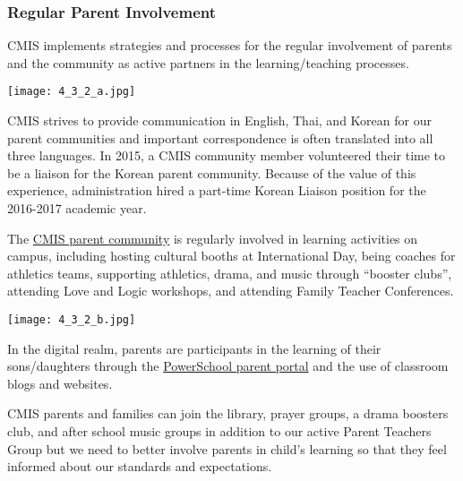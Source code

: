 \subsubsection{Regular Parent Involvement}



\begin{findings}
CMIS implements strategies and processes for the regular involvement of parents and the community as active partners in the learning/teaching processes.

{\centering\texttt{[image: 4\_3\_2\_a.jpg]}}

CMIS strives to provide communication in English, Thai, and Korean for our parent communities and important correspondence is often translated into all three languages.  In 2015, a CMIS community member volunteered their time to be a liaison for the Korean parent community.  Because of the value of this experience, administration hired a part-time Korean Liaison position for the 2016-2017 academic year.

The \href{http://blogs.cmis.ac.th/ptg/}{CMIS parent community} is regularly involved in learning activities on campus, including hosting cultural booths at International Day, being coaches for athletics teams, supporting athletics, drama, and music through “booster clubs”, attending Love and Logic workshops, and attending Family Teacher Conferences.

{\centering\texttt{[image: 4\_3\_2\_b.jpg]}}

In the digital realm, parents are participants in the learning of their sons/daughters through the \href{https://cmis.powerschool.com/public/}{PowerSchool parent portal} and the use of classroom blogs and websites.


CMIS parents and families can join the library, prayer groups, a drama boosters club, and after school music groups in addition to our active Parent Teachers Group but we need to better involve parents in child’s learning so that they feel informed about our standards and expectations.
\end{findings}

